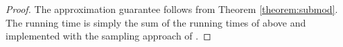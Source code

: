 \begin{proof}
The approximation guarantee follows from Theorem \ref{theorem:submod}. The running time is simply the sum of the running times of \algomaxst{} above and  \algosubmod{} implemented with the sampling approach of \cite{borgs:soda14}. %
\end{proof}


